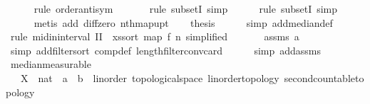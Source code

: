 \begin{isabellebody}
\ \ \ \ \isamarkupfalse%
\ {\isacharparenleft}{\kern0pt}rule\ order{\isacharunderscore}{\kern0pt}antisym{\isacharparenright}{\kern0pt}\isanewline
\ \ \ \ \ \isamarkupfalse%
\ {\isacharparenleft}{\kern0pt}rule\ subsetI{\isacharcomma}{\kern0pt}\ simp{\isacharparenright}{\kern0pt}\isanewline
\ \ \ \ \isamarkupfalse%
\ {\isacharparenleft}{\kern0pt}rule\ subsetI{\isacharcomma}{\kern0pt}\ simp{\isacharparenright}{\kern0pt}\ \isanewline
\ \ \ \ \isamarkupfalse%
\ {\isacharparenleft}{\kern0pt}metis\ add{\isacharunderscore}{\kern0pt}{}\ diff{\isacharunderscore}{\kern0pt}zero\ nth{\isacharunderscore}{\kern0pt}map{\isacharunderscore}{\kern0pt}upt{\isacharparenright}{\kern0pt}\isanewline
\isanewline
\ \ \isamarkupfalse%
\ {\isacharquery}{\kern0pt}thesis\isanewline
\ \ \ \ \isamarkupfalse%
\ {\isacharparenleft}{\kern0pt}simp\ add{\isacharcolon}{\kern0pt}median{\isacharunderscore}{\kern0pt}def{\isacharparenright}{\kern0pt}\isanewline
\ \ \ \ \isamarkupfalse%
\ {\isacharparenleft}{\kern0pt}rule\ mid{\isacharunderscore}{\kern0pt}in{\isacharunderscore}{\kern0pt}interval{\isacharbrackleft}{\kern0pt}\ I{\isacharequal}{\kern0pt}{\isachardoublequoteopen}I{\isachardoublequoteclose}\ \ xs{\isacharequal}{\kern0pt}{\isachardoublequoteopen}sort\ {\isacharparenleft}{\kern0pt}map\ f\ {\isacharbrackleft}{\kern0pt}{}{\isachardot}{\kern0pt}{\isachardot}{\kern0pt}{\isacharless}{\kern0pt}n{\isacharbrackright}{\kern0pt}{\isacharparenright}{\kern0pt}{\isachardoublequoteclose}{\isacharcomma}{\kern0pt}\ simplified{\isacharbrackright}{\kern0pt}{\isacharparenright}{\kern0pt}\isanewline
\ \ \ \ \ \isamarkupfalse%
\ assms\ a\ \isamarkupfalse%
\ {\isacharparenleft}{\kern0pt}simp\ add{\isacharcolon}{\kern0pt}filter{\isacharunderscore}{\kern0pt}sort\ comp{\isacharunderscore}{\kern0pt}def\ length{\isacharunderscore}{\kern0pt}filter{\isacharunderscore}{\kern0pt}conv{\isacharunderscore}{\kern0pt}card{\isacharparenright}{\kern0pt}\isanewline
\ \ \ \ \isamarkupfalse%
\ {\isacharparenleft}{\kern0pt}simp\ add{\isacharcolon}{\kern0pt}assms{\isacharparenright}{\kern0pt}\isanewline
{}\isamarkupfalse%
%
\endisatagproof
{\isafoldproof}%
%
\isadelimproof
\isanewline
%
\endisadelimproof
\isanewline
{}\isamarkupfalse%
\ median{\isacharunderscore}{\kern0pt}measurable{\isacharcolon}{\kern0pt}\isanewline
\ \ \ X\ {\isacharcolon}{\kern0pt}{\isacharcolon}{\kern0pt}\ {\isachardoublequoteopen}nat\ {\isasymRightarrow}\ {\isacharprime}{\kern0pt}a\ {\isasymRightarrow}\ {\isacharparenleft}{\kern0pt}{\isacharprime}{\kern0pt}b\ {\isacharcolon}{\kern0pt}{\isacharcolon}{\kern0pt}\ {\isacharbraceleft}{\kern0pt}linorder{\isacharcomma}{\kern0pt}\ topological{\isacharunderscore}{\kern0pt}space{\isacharcomma}{\kern0pt}\ linorder{\isacharunderscore}{\kern0pt}topology{\isacharcomma}{\kern0pt}\ second{\isacharunderscore}{\kern0pt}countable{\isacharunderscore}{\kern0pt}topology{\isacharbraceright}{\kern0pt}{\isacharparenright}{\kern0pt}{\isachardoublequoteclose}\isanewline

\end{isabellebody}
